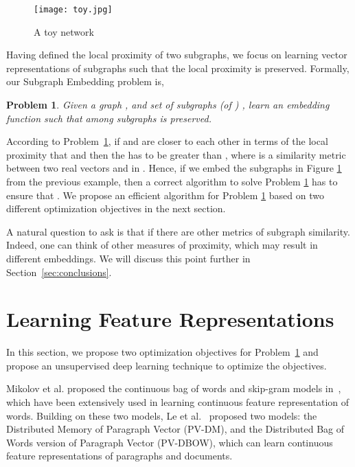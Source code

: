 \documentclass[sigconf]{acmart}
\newtheorem{problem}{Problem}
\begin{document}
\begin{figure}[htb]
	\texttt{[image: toy.jpg]}
	\caption{A toy network}
	\label{fig:toy}
\end{figure}

Having defined the local proximity of two subgraphs, we focus on learning vector representations of subgraphs such that the local proximity is preserved. Formally, our Subgraph Embedding problem is, 

\begin{problem} 
	\label{prob:embedding}
	Given a graph ,  and set of  subgraphs (of ) , learn an embedding function  such that  among subgraphs is preserved.
\end{problem}

According to Problem~\ref{prob:embedding}, if  and  are closer to each other in terms of the local proximity that  and  then the  has to be greater than , where  is a similarity metric between two real vectors  and  in . Hence, if we embed the subgraphs in Figure \ref{fig:toy} from the previous example, then a correct algorithm to solve Problem \ref{prob:embedding} has to ensure that . We propose an efficient algorithm  for Problem \ref{prob:embedding} based on two different optimization objectives in the next section.

A natural question to ask is that if there are other metrics of subgraph similarity. Indeed, one can think of other measures of proximity, which may result in different embeddings. We will discuss this point further in Section~\ref{sec:conclusions}.


\section{Learning Feature Representations}
\label{sec:proposed}
In this section, we propose two optimization objectives for Problem~\ref{prob:embedding} and propose an unsupervised deep learning technique to optimize the objectives.
 
Mikolov et al. proposed the continuous bag of words and skip-gram models in~\cite{mikolov2013distributed}, which have been extensively used in learning continuous feature representation of words. Building on these two models, Le et al.~\cite{le2014distributed} proposed two models: the Distributed Memory of Paragraph Vector (PV-DM), and the Distributed Bag of Words version of Paragraph Vector (PV-DBOW), which can learn continuous feature representations of paragraphs and documents.
\end{document}
